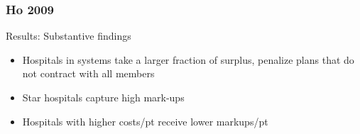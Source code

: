 \begin{frame}
\frametitle{Ho 2009}

Results: Substantive findings
\begin{itemize}
\item Hospitals in systems take a larger fraction of surplus, penalize plans that do not contract with all members
\item Star hospitals capture high mark-ups
\item Hospitals with higher costs/pt receive lower markups/pt
\end{itemize}
\end{frame}